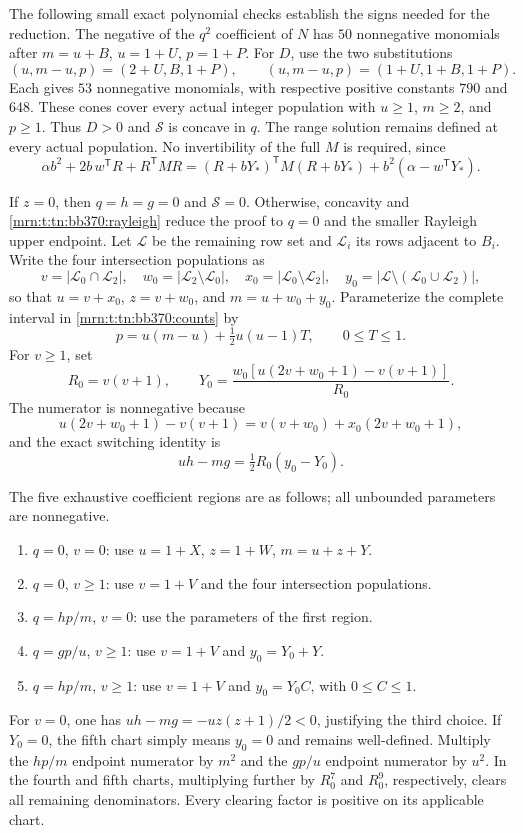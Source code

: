 \documentclass[11pt,a4paper]{article}
\theoremstyle{remark}\newtheorem{remark}[theorem]{Remark}
\begin{document}
The following small exact polynomial checks establish the signs needed
for the reduction.  The negative of the $q^2$ coefficient of $N$ has
$50$ nonnegative monomials after
$m=u+B$, $u=1+U$, $p=1+P$.
For $D$, use the two substitutions
\[
 (u,m-u,p)=(2+U,B,1+P),\qquad
 (u,m-u,p)=(1+U,1+B,1+P).
\]
Each gives $53$ nonnegative monomials, with respective positive constants
$790$ and $648$.  These cones cover every actual integer population with
$u\ge1$, $m\ge2$, and $p\ge1$.  Thus $D>0$ and $\mathcal S$ is concave
in $q$.  The range solution remains defined at every actual population.
No invertibility of the full $M$ is required, since
\[
 \alpha b^2+2b\,w^{\mathsf T}R+R^{\mathsf T}MR
 =(R+bY_*)^{\mathsf T}M(R+bY_*)
   +b^2(\alpha-w^{\mathsf T}Y_*).
\]

If $z=0$, then $q=h=g=0$ and $\mathcal S=0$.
Otherwise, concavity and \eqref{mrn:t:tn:bb370:rayleigh} reduce the proof to
$q=0$ and the smaller Rayleigh upper endpoint.  Let $\mathcal L$ be the
remaining row set and $\mathcal L_i$ its rows adjacent to $B_i$.
Write the four intersection populations as
\[
 v=|\mathcal L_0\cap\mathcal L_2|,\quad
 w_0=|\mathcal L_2\setminus\mathcal L_0|,\quad
 x_0=|\mathcal L_0\setminus\mathcal L_2|,\quad
 y_0=|\mathcal L\setminus(\mathcal L_0\cup\mathcal L_2)|,
\]
so that $u=v+x_0$, $z=v+w_0$, and $m=u+w_0+y_0$.
Parameterize the complete interval in \eqref{mrn:t:tn:bb370:counts} by
\begin{equation}
 p=u(m-u)+\tfrac12u(u-1)T,\qquad 0\le T\le1.
 \label{mrn:t:tn:bb370:pchart}
\end{equation}
For $v\ge1$, set
\[
 R_0=v(v+1),\qquad
 Y_0=\frac{w_0[u(2v+w_0+1)-v(v+1)]}{R_0}.
\]
The numerator is nonnegative because
\[
 u(2v+w_0+1)-v(v+1)
 =v(v+w_0)+x_0(2v+w_0+1),
\]
and the exact switching identity is
\begin{equation}
 uh-mg=\tfrac12R_0(y_0-Y_0).
 \label{mrn:t:tn:bb370:switch}
\end{equation}

The five exhaustive coefficient regions are as follows; all unbounded
parameters are nonnegative.
\begin{enumerate}
\item $q=0$, $v=0$: use $u=1+X$, $z=1+W$, $m=u+z+Y$.
\item $q=0$, $v\ge1$: use $v=1+V$ and the four intersection populations.
\item $q=hp/m$, $v=0$: use the parameters of the first region.
\item $q=gp/u$, $v\ge1$: use $v=1+V$ and $y_0=Y_0+Y$.
\item $q=hp/m$, $v\ge1$: use $v=1+V$ and $y_0=Y_0C$, with $0\le C\le1$.
\end{enumerate}
For $v=0$, one has $uh-mg=-uz(z+1)/2<0$, justifying the third choice.
If $Y_0=0$, the fifth chart simply means $y_0=0$ and remains well-defined.
Multiply the $hp/m$ endpoint numerator by $m^2$ and the $gp/u$ endpoint
numerator by $u^2$.  In the fourth and fifth charts, multiplying further
by $R_0^7$ and $R_0^9$, respectively, clears all remaining denominators.
Every clearing factor is positive on its applicable chart.
\end{document}
